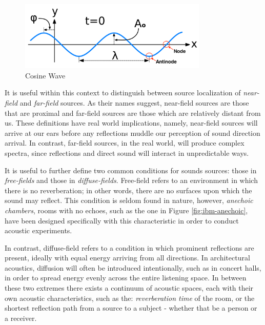 \begin{figure}[ht!]%
\centering
\includegraphics[width=0.8\textwidth]{img/cosine-wave.png} 
\caption{Cosine Wave \cite{FileWave97:online}}
\label{fig:cosine-wave}
\end{figure}

It is useful within this context to distinguish between source localization of \textit{near-field} and \textit{far-field} sources. As their names suggest, near-field sources are those that are proximal and far-field sources are those which are relatively distant from us. These definitions have real world implications, namely, near-field sources will arrive at our ears before any reflections muddle our perception of sound direction arrival. In contrast, far-field sources, in the real world, will produce complex spectra, since reflections and direct sound will interact in unpredictable ways. 

It is useful to further define two common conditions for sounds sources: those in \textit{free-fields} and those in \textit{diffuse-fields}. Free-field refers to an environment in which there is no reverberation; in other words, there are no surfaces upon which the sound may reflect. This condition is seldom found in nature, however, \textit{anechoic chambers}, rooms with no echoes, such as the one in Figure \ref{fig:ibm-anechoic}, have been designed specifically with this characteristic in order to conduct acoustic experiments. 

In contrast, diffuse-field refers to a condition in which prominent reflections are present, ideally with equal energy arriving from all directions. In architectural acoustics, diffusion will often be introduced intentionally, such as in concert halls, in order to spread energy evenly across the entire listening space. In between these two extremes there exists a continuum of acoustic spaces, each with their own acoustic characteristics, such as the: \textit{reverberation time} of the room, or the shortest reflection path from a source to a subject - whether that be a person or a receiver. 

